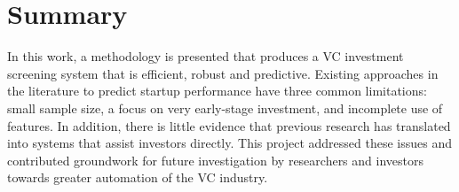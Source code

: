 \documentclass[../thesis/thesis.tex]{subfiles}
\begin{document}
\section{Summary}

In this work, a methodology is presented that produces a VC investment screening system that is efficient, robust and predictive. Existing approaches in the literature to predict startup performance have three common limitations: small sample size, a focus on very early-stage investment, and incomplete use of features. In addition, there is little evidence that previous research has translated into systems that assist investors directly. This project addressed these issues and contributed groundwork for future investigation by researchers and investors towards greater automation of the VC industry.

\end{document}
